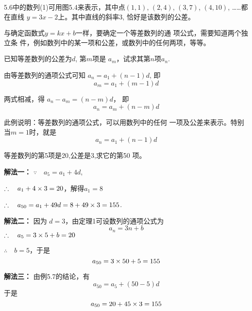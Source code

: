 5.6中的数列(1)可用图5.4来表示，其中点$(1,1)$,
$(2,4)$, $(3,7)$, $(4,10)$, ……都在直线
$y=3x-2$上。其中直线的斜率3, 恰好是该数列的公差。

\begin{figure}[htp]
    \centering
{}
    \caption{}
\end{figure}


与确定函数式$y=kx+b$一样，要确定一个等差数列的通
项公式，需要知道两个独立条
件，例如数列中的某一项和公差，或数列中的任何两项，等等。

\begin{example}
   已知等差数列的公差为$d$, 第$m$项是
$a_m$，试求其第$n$项$a_n$. 
\end{example}

\begin{solution}
    由等差数列的通项公式可知
$a_n=a_1+(n-1)d$, 
即
\[a_m=a_1+(m-1)d\]

两式相减，得
$a_n-a_m=(n-m)d$，
即
\[a_n=a_m+(n-m)d\]
\end{solution}

此例说明：等差数列的通项公式，可以用数列中的任何
一项及公差来表示。特别当$m=1$时，就是
\[a_n=a_1+(n-1)d\]

\begin{example}
    等差数列的第5项是20,公差是3,求它的第50
项。
\end{example}

\begin{solution}
 \textbf{解法一：} $\because\quad a_5=a_1+4d$,

$\therefore\quad a_1+4\times3=20$，解得$a_1=8$

$\therefore\quad a_{50}=a_1+49d=8+49\times3=155$.

\textbf{解法二：} 因为
$d=3$，由定理1可设数列的通项公式为
\[a_n=3n+b\]
$\therefore\quad a_5=3\times5+b=20$

$\therefore\quad b=5$，于是
\[a_{50}=3\times50+5=155\]

\textbf{解法三：} 由例5.7的结论，有
\[a_{50}=a_5+(50-5)d\]
于是
\[a_{50}=20+45\times3=155\]
\end{solution}

